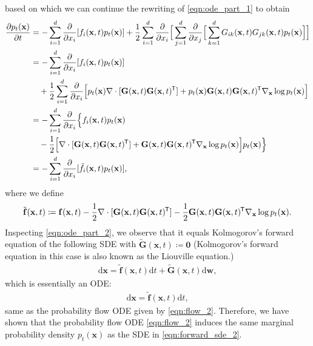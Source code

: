 \documentclass{article} \usepackage{iclr2021_conference,times}
\newcommand*{\tran}{^{\mkern-1.5mu\mathsf{T}}}
\newcommand{\ud}{\mathrm{d}}
\newcommand{\bfx}{\mathbf{x}}
\newcommand{\bfw}{\mathbf{w}}
\newcommand{\bff}{\mathbf{f}}
\newcommand{\bfzero}{\mathbf{0}}
\newcommand{\bfG}{\mathbf{G}}
\begin{document}
based on which we can continue the rewriting of \cref{eqn:ode_part_1} to obtain
\begin{align}
    \frac{\partial p_t(\bfx)}{\partial t} &= -\sum_{i=1}^d \frac{\partial}{\partial x_i}[f_i(\bfx, t) p_t(\bfx)] + \frac{1}{2}\sum_{i=1}^d \frac{\partial}{\partial x_i} \Big[ \sum_{j=1}^d \frac{\partial}{\partial x_j}\Big[\sum_{k=1}^d G_{ik}(\bfx, t) G_{jk}(\bfx, t) p_t(\bfx)\Big]\Big]\notag \\
     &= -\sum_{i=1}^d \frac{\partial}{\partial x_i}[f_i(\bfx, t) p_t(\bfx)] \notag \\
     &\quad + \frac{1}{2}\sum_{i=1}^d \frac{\partial}{\partial x_i} \Big[ p_t(\bfx) \nabla \cdot [\bfG(\bfx, t)\bfG(\bfx, t)\tran] + p_t(\bfx) \bfG(\bfx, t)\bfG(\bfx, t)\tran \nabla_\bfx \log p_t(\bfx) \Big]\notag \\
     &= -\sum_{i=1}^d \frac{\partial}{\partial x_i}\Big\{ f_i(\bfx, t)p_t(\bfx) \notag \\
     &\quad - \frac{1}{2} \Big[ \nabla \cdot [\bfG(\bfx, t)\bfG(\bfx, t)\tran] +  \bfG(\bfx, t)\bfG(\bfx, t)\tran \nabla_\bfx \log p_t(\bfx) \Big] p_t(\bfx) \Big\}\notag \\
     &= -\sum_{i=1}^d \frac{\partial}{\partial x_i} [\tilde{f}_i(\bfx, t)p_t(\bfx)],\label{eqn:ode_part_2}
\end{align}
where we define
\begin{align*}
    \tilde{\bff}(\bfx, t) \coloneqq \bff(\bfx, t) - \frac{1}{2} \nabla \cdot [\bfG(\bfx, t)\bfG(\bfx, t)\tran] - \frac{1}{2} \bfG(\bfx, t)\bfG(\bfx, t)\tran \nabla_\bfx \log p_t(\bfx).
\end{align*}
Inspecting \cref{eqn:ode_part_2}, we observe that it equals Kolmogorov's forward equation of the following SDE with $\tilde{\bfG}(\bfx, t) \coloneqq \bfzero$ (Kolmogorov's forward equation in this case is also known as the Liouville equation.)
\begin{align*}
    \ud \bfx = \tilde{\bff}(\bfx, t) \ud t + \tilde{\bfG}(\bfx, t) \ud \bfw,
\end{align*}
which is essentially an ODE:
\begin{align*}
    \ud \bfx = \tilde{\bff}(\bfx, t) \ud t,
\end{align*}
same as the probability flow ODE given by \cref{eqn:flow_2}. Therefore, we have shown that the probability flow ODE \cref{eqn:flow_2} induces the same marginal probability density $p_t(\bfx)$ as the SDE in \cref{eqn:forward_sde_2}.
\end{document}
